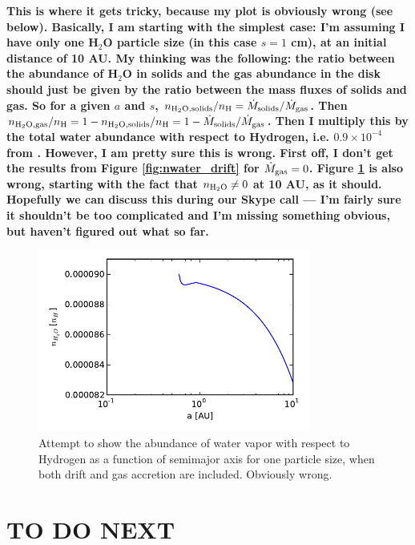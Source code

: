 \documentclass[12pt, preprint]{aastex}
\begin{document}
\textbf{This is where it gets tricky, because my plot is obviously wrong (see below). Basically, I am starting with the simplest case: I'm assuming I have only one H$_2$O particle size (in this case $s=1$ cm), at an initial distance of 10 AU. My thinking was the following: the ratio between the abundance of H$_2$O in solids and the gas abundance in the disk should just be given by the ratio between the mass fluxes of solids and gas. So for a given $a$ and $s$, $n_{\rm H_2 O, solids}/n_{\rm H} = \dot{M}_{\rm solids}/\dot{M}_{\rm gas}$. Then $n_{\rm H_2 O, gas}/n_{\rm H} = 1-n_{\rm H_2 O, solids}/n_{\rm H}=1-\dot{M}_{\rm solids}/\dot{M}_{\rm gas}$. Then I multiply this by the total water abundance with respect to Hydrogen, i.e. $0.9 \times 10^{-4}$ from \citet{oberg11}. However, I am pretty sure this is wrong. First off, I don't get the results from Figure \ref{fig:nwater_drift} for $\dot{M}_{\rm gas}=0$. Figure \ref{fig:wrong} is also wrong, starting with the fact that $n_{\rm H_2 O} \neq 0$ at 10 AU, as it should. Hopefully we can discuss this during our Skype call --- I'm fairly sure it shouldn't be too complicated and I'm missing something obvious, but haven't figured out what so far.}

\begin{figure}[htb]
\centering
\includegraphics[width=0.8\textwidth]{../figs/nH2O_acc_wrong.pdf}
\caption{Attempt to show the abundance of water vapor with respect to Hydrogen as a function of semimajor axis for one particle size, when both drift and gas accretion are included. Obviously wrong.} %
\label{fig:wrong}
\end{figure}


\section{TO DO NEXT}
\end{document}
